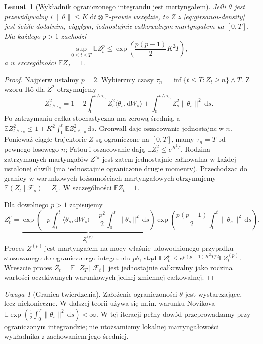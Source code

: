 \documentclass[11pt,a4paper,oneside]{report}
\numberwithin{equation}{chapter}
\theoremstyle{plain}
\newtheorem{lemat}[twierdzenie]{Lemat}
\theoremstyle{definition}
\theoremstyle{remark}
\newtheorem{uwaga}{Uwaga}[chapter]
\newcommand{\Prob}{\mathbb{P}}
\newcommand{\E}{\mathbb{E}}
\newcommand{\calF}{\mathcal{F}}
\newcommand{\dd}{\mathrm{d}}
\newcommand{\norm}[1]{\lVert #1\rVert}
\begin{document}
\begin{lemat}[Wykładnik ograniczonego integrandu jest martyngałem]
\label{lem:bounded-exponential}
Jeśli $\theta$ jest przewidywalny i
$\norm{\theta}\le K$ $\dd t\otimes\Prob$-prawie wszędzie,
to $Z$ z \eqref{eq:girsanov-density} jest ściśle dodatnim,
ciągłym, jednostajnie całkowalnym martyngałem na $[0,T]$.
Dla każdego $p>1$ zachodzi
\[
\sup_{0\le t\le T}\E Z_t^p
\le\exp\left(\frac{p(p-1)}2 K^2T\right),
\tag{8.4}\label{eq:z-moments}
\]
a w szczególności $\E Z_T=1$.
\end{lemat}
\begin{proof}
Najpierw ustalmy $p=2$. Wybierzmy czasy
$\tau_n=\inf\{t\le T:Z_t\ge n\}\wedge T$.
Z wzoru Itô dla $Z^2$ otrzymujemy
\[
Z_{t\wedge\tau_n}^2
=1-2\int_0^{t\wedge\tau_n}Z_s^2\langle\theta_s,\dd W_s\rangle
+\int_0^{t\wedge\tau_n}Z_s^2\norm{\theta_s}^2\,\dd s.
\]
Po zatrzymaniu całka stochastyczna ma zerową średnią,
a $\E Z_{t\wedge\tau_n}^2\le
1+K^2\int_0^t\E Z_{s\wedge\tau_n}^2\,\dd s$.
Gronwall daje oszacowanie jednostajne w $n$.
Ponieważ ciągłe trajektorie $Z$ są ograniczone na
$[0,T]$, mamy $\tau_n=T$ od pewnego losowego $n$;
Fatou i oszacowanie dają $\E Z_t^2\le e^{K^2T}$.
Rodzina zatrzymanych martyngałów $Z^{\tau_n}$
jest zatem jednostajnie całkowalna w każdej ustalonej
chwili (ma jednostajnie ograniczone drugie momenty).
Przechodząc do granicy w warunkowych tożsamościach
martyngałowych otrzymujemy $\E(Z_t\mid\calF_s)=Z_s$.
W szczególności $\E Z_t=1$.

Dla dowolnego $p>1$ zapisujemy
\[
Z_t^p=\underbrace{\exp\left(
-p\int_0^t\langle\theta_s,\dd W_s\rangle
-\frac{p^2}2\int_0^t\norm{\theta_s}^2\,\dd s\right)}_{Z_t^{(p)}}
\exp\left(\frac{p(p-1)}2\int_0^t\norm{\theta_s}^2\,\dd s\right).
\]
Proces $Z^{(p)}$ jest martyngałem na mocy właśnie
udowodnionego przypadku stosowanego do ograniczonego
integrandu $p\theta$; stąd
$\E Z_t^p\le e^{p(p-1)K^2T/2}\E Z_t^{(p)}$.
Wreszcie proces $Z_t=\E[Z_T\mid\calF_t]$ jest
jednostajnie całkowalny jako rodzina wartości oczekiwanych
warunkowych jednej zmiennej całkowalnej.
\end{proof}

\begin{uwaga}[Granica twierdzenia]
Założenie ograniczoności $\theta$ jest wystarczające,
lecz niekonieczne. W dalszej teorii używa się m.in.
warunku Novikova
$\E\exp(\frac12\int_0^T\norm{\theta_s}^2\,\dd s)<\infty$.
W tej iteracji pełny dowód przeprowadzamy przy
ograniczonym integrandzie; nie utożsamiamy lokalnej
martyngałowości wykładnika z zachowaniem jego średniej.
\end{uwaga}
\end{document}
